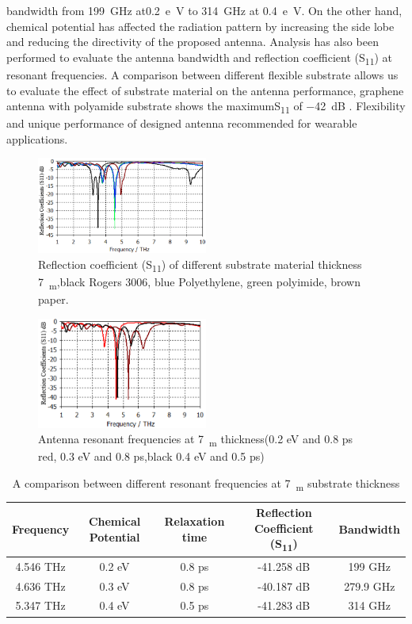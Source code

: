 \documentclass[12pt]{suhbook}
\begin{document}
bandwidth from \SI{199}{\GHz} at\SI{0.2}{e \volt} to \SI{314}{\GHz} at \SI{0.4}{e \volt}. On the other hand, chemical potential has affected the radiation pattern by increasing the side lobe and reducing the directivity of the proposed antenna. Analysis has also been performed to evaluate the antenna bandwidth and reflection coefficient (\si{S_{11}}) at resonant frequencies. A comparison between different flexible substrate allows us to evaluate the effect of substrate material on the antenna performance, graphene antenna with polyamide substrate shows the maximum\si{S_{11}} of \SI{-42}{\deci\bel} . Flexibility and unique performance of designed antenna recommended for wearable applications.
\begin{figure}[hbt!]
\centering
\includegraphics[width=0.5\textwidth]{4}
\caption{Reflection coefficient (\si{S_{11}}) of different substrate material thickness \SI{7}{\mu_m},black Rogers 3006, blue Polyethylene, green polyimide, brown paper.}
\label{Fig 4}
\end{figure}
\begin{figure}[h]
\centering
\includegraphics[width=0.5\textwidth]{5}
\caption{Antenna resonant frequencies at \SI{7}{\mu_m} thickness(0.2 eV and 0.8 ps red, 0.3 eV and 0.8 ps,black 0.4 eV and 0.5 ps)}
\label{Fig 5}
\end{figure}
\begin{table}[hbt!]
\centering
\begin{tabular}{||c c c c c||}
\hline
Frequency & Chemical Potential & Relaxation time & Reflection Coefficient (\si{S_{11}}) & Bandwidth \\[0.5ex] 
\hline\hline
4.546 THz & 0.2 eV & 0.8 ps &  -41.258 dB & 199 GHz \\ 
\hline
4.636 THz & 0.3 eV & 0.8 ps & -40.187 dB & 279.9 GHz \\
\hline
5.347 THz & 0.4 eV & 0.5 ps & -41.283 dB & 314 GHz \\[1ex] 
\hline
\end{tabular}
\caption{A comparison between different resonant frequencies at \SI{7}{\mu_m} substrate thickness }
\label{table:3}
\end{table}
\end{document}
